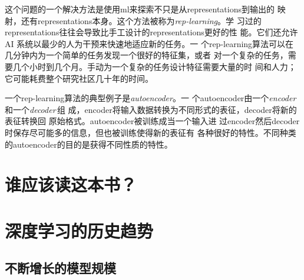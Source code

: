 这个问题的一个解决方法是使用\gls*{ml}来探索不只是从\gls*{representations}到输出的
映射，还有\gls*{representations}本身。这个方法被称为\emph{\gls{rep-learning}}。学
习过的\gls*{representations}往往会导致比手工设计的\gls*{representations}更好的性
能。它们还允许 AI 系统以最少的人为干预来快速地适应新的任务。一
个\gls*{rep-learning}算法可以在几分钟内为一个简单的任务发现一个很好的特征集，或者
对一个复杂的任务，需要几个小时到几个月。手动为一个复杂的任务设计特征需要大量的时
间和人力；它可能耗费整个研究社区几十年的时间。

一个\gls*{rep-learning}算法的典型例子是\emph{\gls{autoencoder}}。一
个\gls*{autoencoder}由一个\emph{\gls{encoder}}\,和一个\emph{\gls{decoder}}\,组
成，\gls*{encoder}将输入数据转换为不同形式的表征，\gls*{decoder}将新的表征转换回
原始格式。\gls*{autoencoder}被训练成当一个输入进
过\gls*{encoder}然后\gls*{decoder}时保存尽可能多的信息，但也被训练使得新的表征有
各种很好的特性。不同种类的\gls*{autoencoder}的目的是获得不同性质的特性。

\section{谁应该读这本书？}

\section{深度学习的历史趋势}



\subsection{不断增长的模型规模}
\label{subsec:increasing_model_sizes}
